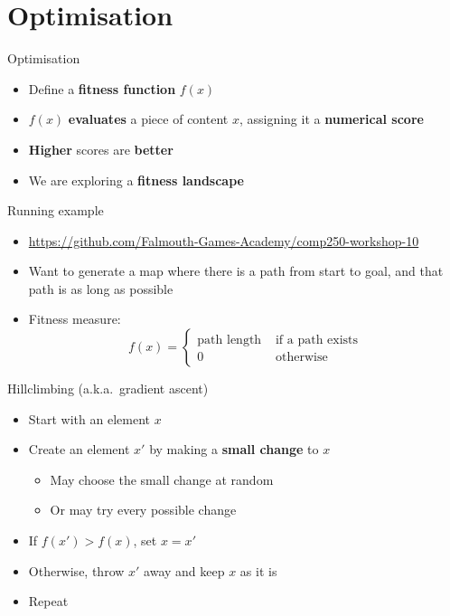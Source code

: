 \part{Optimisation}
\frame{\partpage}

\begin{frame}{Optimisation}
	\begin{itemize}
		\pause\item Define a \textbf{fitness function} $f(x)$
		\pause\item $f(x)$ \textbf{evaluates} a piece of content $x$, assigning it a \textbf{numerical score}
		\pause\item \textbf{Higher} scores are \textbf{better}
		\pause\item We are exploring a \textbf{fitness landscape}
	\end{itemize}
\end{frame}

\begin{frame}{Running example}
	\begin{itemize}
		\pause\item \url{https://github.com/Falmouth-Games-Academy/comp250-workshop-10}
		\pause\item Want to generate a map where there is a path from start to goal,
			and that path is as long as possible
		\pause\item Fitness measure:
		$$ f(x) = \begin{cases}
			\text{path length} & \text{ if a path exists} \\
			0 & \text{ otherwise}
		\end{cases} $$
	\end{itemize}
\end{frame}

\begin{frame}{Hillclimbing (a.k.a.\ gradient ascent)}
	\begin{itemize}
		\pause\item Start with an element $x$
		\pause\item Create an element $x'$ by making a \textbf{small change} to $x$
			\begin{itemize}
				\pause\item May choose the small change at random
				\pause\item Or may try every possible change
			\end{itemize}
		\pause\item If $f(x') > f(x)$, set $x = x'$
		\pause\item Otherwise, throw $x'$ away and keep $x$ as it is
		\pause\item Repeat
	\end{itemize}
\end{frame}

